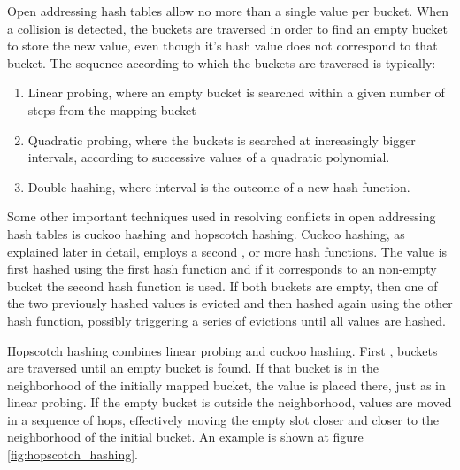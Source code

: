Open addressing hash tables allow no more than a single value per bucket. When a collision is detected, the buckets are traversed in order to find an empty bucket to store the new value, even though it’s hash value does not correspond to that bucket. The sequence according to which the buckets are traversed is typically:

\begin{enumerate}
	\item Linear probing, where an empty bucket is searched within a given number of steps from the mapping bucket
	\item Quadratic probing, where the buckets is searched at increasingly bigger intervals, according to successive values of a quadratic polynomial. 
	\item Double hashing, where interval is the outcome of a new hash function.
\end{enumerate}

 Some other important techniques used in resolving conflicts in open addressing hash tables is cuckoo hashing and hopscotch hashing. Cuckoo hashing, as explained later in detail, employs a second , or more hash functions. The value is first hashed using the first hash function  and if it corresponds to an non-empty bucket the second hash function is used. If both buckets are empty, then one of the two previously hashed values is evicted and then hashed again using the other hash function, possibly triggering a series of evictions until all values are hashed.


Hopscotch hashing combines linear probing and cuckoo hashing. First , buckets are traversed until an empty bucket is found. If that bucket is in the neighborhood of the initially mapped bucket, the value is placed there, just as in linear probing. If the empty bucket is outside the neighborhood, values are moved in a sequence of hops, effectively moving the empty slot closer and closer to the neighborhood of the initial bucket. An example is shown at figure \ref{fig:hopscotch_hashing}.

